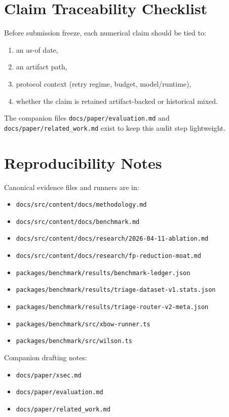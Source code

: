 \documentclass[11pt]{article}
\begin{document}
\section{Claim Traceability Checklist}

Before submission freeze, each numerical claim should be tied to:

\begin{enumerate}[leftmargin=*]
  \item an as-of date,
  \item an artifact path,
  \item protocol context (retry regime, budget, model/runtime),
  \item whether the claim is retained artifact-backed or historical mixed.
\end{enumerate}

The companion files \texttt{docs/paper/evaluation.md} and
\texttt{docs/paper/related\_work.md} exist to keep this audit step lightweight.

\section{Reproducibility Notes}

Canonical evidence files and runners are in:
\begin{itemize}
  \item \texttt{docs/src/content/docs/methodology.md}
  \item \texttt{docs/src/content/docs/benchmark.md}
  \item \texttt{docs/src/content/docs/research/2026-04-11-ablation.md}
  \item \texttt{docs/src/content/docs/research/fp-reduction-moat.md}
  \item \texttt{packages/benchmark/results/benchmark-ledger.json}
  \item \texttt{packages/benchmark/results/triage-dataset-v1.stats.json}
  \item \texttt{packages/benchmark/results/triage-router-v2-meta.json}
  \item \texttt{packages/benchmark/src/xbow-runner.ts}
  \item \texttt{packages/benchmark/src/wilson.ts}
\end{itemize}

Companion drafting notes:

\begin{itemize}
  \item \texttt{docs/paper/xsec.md}
  \item \texttt{docs/paper/evaluation.md}
  \item \texttt{docs/paper/related\_work.md}
\end{itemize}
\end{document}
